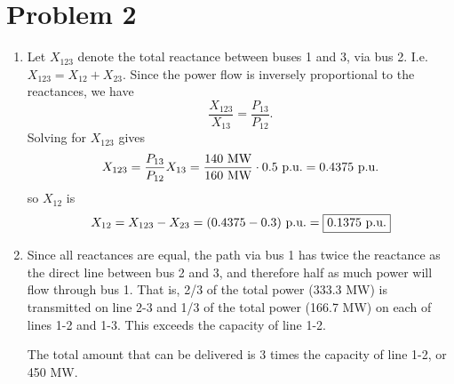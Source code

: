 \documentclass{homework}
\begin{document}
\section{Problem 2}
\renewcommand{\MW}{\text{ MW}}
\begin{enumerate}
    \item Let $X_{123}$ denote the total reactance between buses 1 and 3, via bus 2. I.e. $X_{123} = X_{12} + X_{23}$.
    Since the power flow is inversely proportional to the reactances, we have
    \begin{equation*}
        \frac{X_{123}}{X_{13}} = \frac{P_{13}}{P_{12}}.
    \end{equation*}
    Solving for $X_{123}$ gives
    \begin{equation*}
        X_{123} = \frac{P_{13}}{P_{12}} X_{13} = \frac{140\MW}{160 \MW} \cdot 0.5 \pu = 0.4375 \pu
    \end{equation*}
    so $X_{12}$ is
    \begin{equation*}
        X_{12} = X_{123} - X_{23} = (0.4375 - 0.3) \text{ p.u.} = \boxed{0.1375 \text{ p.u.}}
    \end{equation*}

    \item Since all reactances are equal, the path via bus 1 has twice the reactance as the direct
    line between bus 2 and 3, and therefore half as much power will flow through bus 1. That is,
    2/3 of the total power (333.3 MW) is transmitted on line 2-3 and 1/3 of the total power (166.7 MW) on each
    of lines 1-2 and 1-3.  This exceeds the capacity of line 1-2.

    The total amount that can be delivered is 3 times the capacity of line 1-2, or 450 MW.
\end{enumerate}
\end{document}
